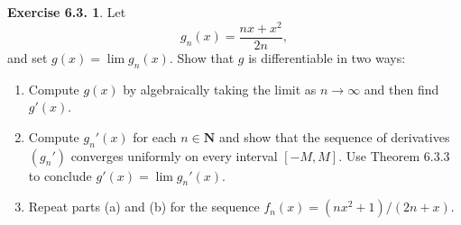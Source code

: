 \documentclass[12pt]{article}
\theoremstyle{definition}
\theoremstyle{exercise}
\newtheorem{exercise}{Exercise 6.3.}
\theoremstyle{solution}
\newcommand{\N}{\mathbf{N}}
\begin{document}
\begin{exercise}
\label{ex:5}
    Let
    \[
        g_n(x) = \frac{nx + x^2}{2n},
    \]
    and set \( g(x) = \lim g_n(x) \). Show that \( g \) is differentiable in two ways:
    \begin{enumerate}
        \item Compute \( g(x) \) by algebraically taking the limit as \( n \to \infty \) and then find \( g'(x) \).

        \item Compute \( g_n'(x) \) for each \( n \in \N \) and show that the sequence of derivatives \( (g_n') \) converges uniformly on every interval \( [-M, M] \). Use Theorem 6.3.3 to conclude \( g'(x) = \lim g_n'(x) \).

        \item Repeat parts (a) and (b) for the sequence \( f_n(x) = (nx^2 + 1)/(2n + x) \).
    \end{enumerate}
\end{exercise}
\end{document}
